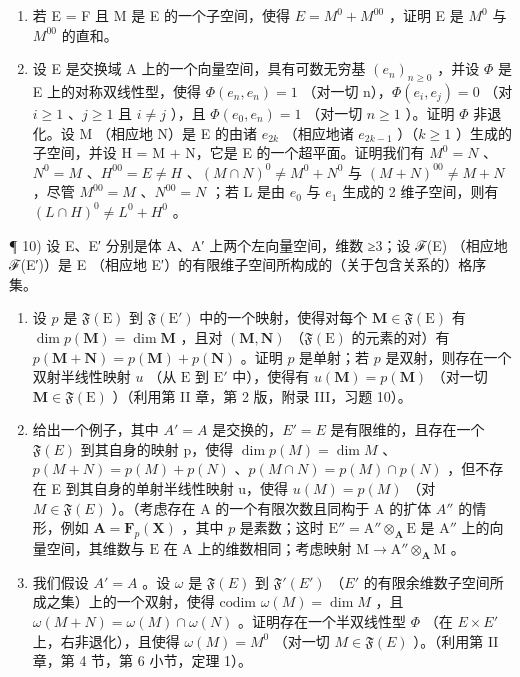 \begin{enumerate}
\def\labelenumi{\alph{enumi})}
\setcounter{enumi}{2}
\item
  若 E = F 且 M 是 E 的一个子空间，使得 \(E = M^{0} + M^{00}\) ，证明 E 是 \(M^{0}\) 与 \(M^{00}\) 的直和。
\item
  设 E 是交换域 A 上的一个向量空间，具有可数无穷基 \((e_{n})_{n\geqslant0}\) ，并设 \(\Phi\) 是 E 上的对称双线性型，使得 \(\Phi(e_{n}, e_{n}) = 1\) （对一切 n），\(\Phi(e_{i}, e_{j}) = 0\) （对 \(i \geqslant 1\) 、\(j \geqslant 1\) 且 \(i \neq j\) ），且 \(\Phi(e_{0}, e_{n}) = 1\) （对一切 \(n \geqslant 1\) ）。证明 \(\Phi\) 非退化。设 M （相应地 N）是 E 的由诸 \(e_{2k}\) （相应地诸 \(e_{2k-1}\) ）（\(k \geqslant 1\) ）生成的子空间，并设 H = M + N，它是 E 的一个超平面。证明我们有 \(M^{0} = N\) 、\(N^{0} = M\) 、\(H^{00} = E \neq H\) 、\((M \cap N)^{0} \neq M^{0} + N^{0}\) 与 \((M + N)^{00} \neq M + N\) ，尽管 \(M^{00} = M\) 、\(N^{00} = N\) ；若 L 是由 \(e_{0}\) 与 \(e_{1}\) 生成的 2 维子空间，则有 \((L \cap H)^{0} \neq L^{0} + H^{0}\) 。
\end{enumerate}

¶ 10) 设 E、E′ 分别是体 A、A′ 上两个左向量空间，维数 ≥3；设 ℱ(E) （相应地 ℱ(E′)）是 E （相应地 E′）的有限维子空间所构成的（关于包含关系的）格序集。

\begin{enumerate}
\def\labelenumi{\alph{enumi})}
\item
  设 \(p\) 是 \(\mathfrak{F}(\mathrm{E})\) 到 \(\mathfrak{F}(\mathrm{E}')\) 中的一个映射，使得对每个 \(\mathbf{M} \in \mathfrak{F}(\mathrm{E})\) 有 \(\dim p(\mathbf{M}) = \dim \mathbf{M}\) ，且对 \((\mathbf{M}, \mathbf{N})\) （\(\mathfrak{F}(\mathrm{E})\) 的元素的对）有 \(p(\mathbf{M} + \mathbf{N}) = p(\mathbf{M}) + p(\mathbf{N})\) 。证明 \(p\) 是单射；若 \(p\) 是双射，则存在一个双射半线性映射 \(u\) （从 \(\mathrm{E}\) 到 \(\mathrm{E}'\) 中），使得有 \(u(\mathbf{M}) = p(\mathbf{M})\) （对一切 \(\mathbf{M} \in \mathfrak{F}(\mathrm{E})\) ）（利用第 II 章，第 2 版，附录 III，习题 10）。
\item
  给出一个例子，其中 \(A' = A\) 是交换的，\(E' = E\) 是有限维的，且存在一个 \(\mathfrak{F}(E)\) 到其自身的映射 p，使得 \(\dim p(M) = \dim M\) 、\(p(M + N) = p(M) + p(N)\) 、\(p(M \cap N) = p(M) \cap p(N)\) ，但不存在 E 到其自身的单射半线性映射 u，使得 \(u(M) = p(M)\) （对 \(M \in \mathfrak{F}(E)\) ）。（考虑存在 A 的一个有限次数且同构于 A 的扩体 \(A''\) 的情形，例如 \(\mathbf{A} = \mathbf{F}_{p}(\mathbf{X})\) ，其中 \(p\) 是素数；这时 \(\mathrm{E}'' = \mathrm{A}'' \otimes_{\mathbf{A}} \mathrm{E}\) 是 \(\mathrm{A}''\) 上的向量空间，其维数与 \(\mathrm{E}\) 在 \(\mathrm{A}\) 上的维数相同；考虑映射 \(\mathrm{M} \to \mathrm{A}'' \otimes_{\mathbf{A}} \mathrm{M}\) 。
\item
  我们假设 \(A' = A\) 。设 \(\omega\) 是 \(\mathfrak{F}(E)\) 到 \(\mathfrak{F}'(E')\) （\(E'\) 的有限余维数子空间所成之集）上的一个双射，使得 \(\text{codim } \omega(M) = \dim M\) ，且 \(\omega(M + N) = \omega(M) \cap \omega(N)\) 。证明存在一个半双线性型 \(\Phi\) （在 \(E \times E'\) 上，右非退化），且使得 \(\omega(M) = M^0\) （对一切 \(M \in \mathfrak{F}(E)\) ）。（利用第 II 章，第 4 节，第 6 小节，定理 1）。
\end{enumerate}

